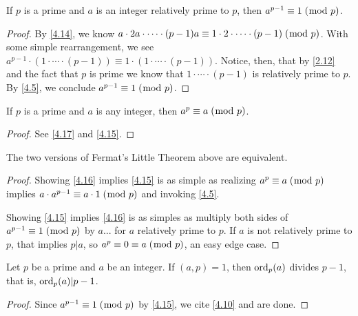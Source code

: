 \documentclass[../main.tex]{subfiles}
\begin{document}
\begin{thm} \label{4.15}
  If $p$ is a prime and $a$ is an integer relatively prime to $p$, then $a^{p-1} \equiv 1 \; (\bmod \; p)$.
\end{thm}

\begin{proof}
  By \ref{4.14}, we know $a \cdot 2a \cdot \cdots \cdot (p-1)a \equiv 1 \cdot 2 \cdot \cdots \cdot (p-1) \; (\bmod \; p)$. With some simple rearrangement, we see $a^{p-1} \cdot (1 \cdot \cdots \cdot (p-1)) \equiv 1 \cdot (1 \cdot \cdots \cdot (p-1))$.
  Notice, then, that by \ref{2.12} and the fact that $p$ is prime we know that $1 \cdot \cdots \cdot (p-1)$ is relatively prime to $p$. By \ref{4.5}, we conclude $a^{p-1} \equiv 1 \; (\bmod \; p)$.
\end{proof}



\begin{thm} \label{4.16}
  If $p$ is a prime and $a$ is any integer, then $a^p \equiv a \; (\bmod \; p)$.
\end{thm}

\begin{proof}
  See \ref{4.17} and \ref{4.15}.
\end{proof}



\begin{thm} \label{4.17}
  The two versions of Fermat's Little Theorem above are equivalent.
\end{thm}

\begin{proof}
  Showing \ref{4.16} implies \ref{4.15} is as simple as realizing $a^p \equiv a \; (\bmod \; p)$ implies $a \cdot a^{p-1} \equiv a \cdot 1 \; (\bmod \; p)$ and invoking \ref{4.5}.

  Showing \ref{4.15} implies \ref{4.16} is as simples as multiply both sides of $a^{p-1} \equiv 1 \; (\bmod \; p)$ by $a$... for $a$ relatively prime to $p$. If $a$ is not relatively prime to $p$, that implies $p | a$, so $a^p \equiv 0 \equiv a \; (\bmod \; p)$, an easy edge case.
\end{proof}



\begin{thm} \label{4.18}
  Let $p$ be a prime and $a$ be an integer. If $(a, p) = 1$, then $\operatorname{ord}_p (a)$ divides $p-1$, that is, $\operatorname{ord}_p(a) | p-1$.
\end{thm}

\begin{proof}
  Since $a^{p-1} \equiv 1 \; (\bmod \; p)$ by \ref{4.15}, we cite \ref{4.10} and are done.
\end{proof}
\end{document}
